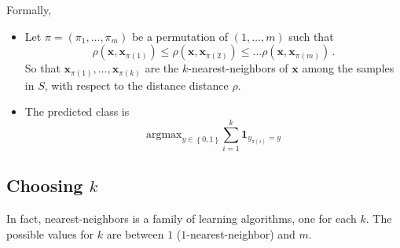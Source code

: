 \documentclass[11pt]{article}
\newcommand{\VV}[1]{\mathbf{#1}}
\begin{document}
Formally, 
\begin{itemize}
  \item Let $\pi = (\pi_1,\ldots,\pi_m)$ be a permutation of $(1,\ldots,m)$ such
    that \[\rho(\VV{x},\VV{x}_{\pi(1)}) \leq \rho(\VV{x},\VV{x}_{\pi(2)}) \leq
    \ldots \rho(\VV{x},\VV{x}_{\pi(m)})\,.\]
    So that $\VV{x}_{\pi(1)} ,\ldots,\VV{x}_{\pi(k)}$ are the
    $k$-nearest-neighbors of $\VV{x}$ among the samples in $S$, with respect to
    the distance distance $\rho$. 
  \item The predicted class is 
    \[
      \text{argmax}_{y\in\left\{ 0,1 \right\}}
    \sum_{ i=1}^k\mathbf{1}_{y_{\pi(i)}=y}
    \]
\end{itemize}

\subsection{Choosing $k$}
In fact, nearest-neighbors is a family
of learning algorithms, one for each $k$. 
The possible values
for $k$ are between $1$ ($1$-nearest-neighbor) and $m$. 
\end{document}
